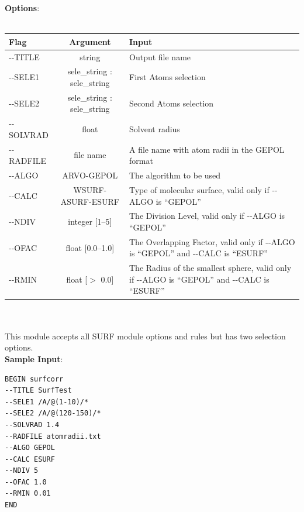 \documentclass[11pt,twoside,onecolumn,a4paper,openright,notitlepage]{book}[2001/04/21]
\begin{document}
\textbf{\large Options}:\\\\
\begin{tabular}{l|c|p{7.0cm}}
Flag & Argument & Input \\
\hline
-{}-TITLE         & string                        & Output file name\\
-{}-SELE1         & sele\_string : sele\_string   & First Atoms selection\\
-{}-SELE2         & sele\_string : sele\_string   & Second Atoms selection\\
-{}-SOLVRAD       & float                         & Solvent radius\\
-{}-RADFILE       & file name                     & A file name with atom radii in the GEPOL format\\
-{}-ALGO          & ARVO-GEPOL                    & The algorithm to be used\\
-{}-CALC          & WSURF-ASURF-ESURF             & Type of molecular surface, valid only if -{}-ALGO is ``GEPOL''\\
-{}-NDIV          & integer [1--5]                & The Division Level, valid only if -{}-ALGO is ``GEPOL''\\
-{}-OFAC          & float [0.0--1.0]              & The Overlapping Factor, valid only if -{}-ALGO is ``GEPOL'' and -{}-CALC is ``ESURF''\\
-{}-RMIN          & float [$>$ 0.0]                 & The Radius of the smallest sphere, valid only if -{}-ALGO is ``GEPOL'' and -{}-CALC is ``ESURF''\\
\end{tabular}\\\\

This module accepts all SURF module options and rules but has two selection options.\\

\textbf{\large Sample Input}:
\begin{verbatim}
BEGIN surfcorr
--TITLE SurfTest
--SELE1 /A/@(1-10)/*
--SELE2 /A/@(120-150)/*
--SOLVRAD 1.4
--RADFILE atomradii.txt
--ALGO GEPOL
--CALC ESURF
--NDIV 5
--OFAC 1.0
--RMIN 0.01
END
\end{verbatim}

\clearpage
\end{document}
